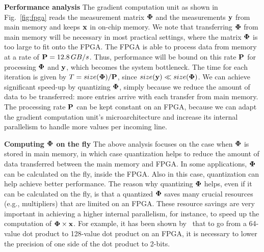 {\bf Performance analysis} The gradient computation unit as shown in Fig.~\ref{fig:fpga} reads the measurement matrix ${\bf \Phi}$ and the measurements ${\bf y}$ from main memory and keeps ${\bf x}$ in on-chip memory. 
We note that transferring ${\bf \Phi}$ from main memory will be necessary in most practical settings, where the matrix ${\bf \Phi}$ is too large to fit onto the FPGA. 
The FPGA is able to process data from memory at a rate of ${\bf P}=12.8\,GB/s$. 
Thus, performance will be bound on this rate ${\bf P}$ for processing ${\bf \Phi}$ and ${\bf y}$, which becomes the system bottleneck. The time for each iteration is given by 
$T = size({\bf \Phi})/{\bf P}$, since $size({\bf y}) \ll size({\bf \Phi})$. 
We can achieve significant speed-up by quantizing ${\bf \Phi}$, simply because we reduce the amount of data to be transferred: more entries arrive with each transfer from main memory. 
The processing rate ${\bf P}$ can be kept constant on an FPGA, because we can adapt the gradient computation unit's microarchitecture and increase its internal parallelism to handle more values per incoming line. 

{\bf Computing ${\bf \Phi}$ on the fly} The above analysis focuses on the case when ${\bf \Phi}$ 
is stored in main memory, in which case quantization helps to reduce the amount of 
data transferred between the main memory and FPGA. In some applications, ${\bf \Phi}$
can be calculated on the fly, inside the FPGA. Also in this case, quantization can help 
achieve better performance.
The reason why quantizing ${\bf \Phi}$ helps, even if it can be calculated on the fly, is
that a quantized ${\bf \Phi}$ saves many crucial resources (e.g., multipliers) that
are limited on an FPGA. These resource savings are very important in achieving a higher 
internal parallelism, for instance, to speed up the computation of ${\bf \Phi}\times{\bf x}$. 
For example, it has been shown by~\cite{kara2017fpga} that to go from a 64-value dot product to 128-value
dot product on an FPGA, it is necessary to lower the precision of one side of the dot product to 2-bits.
